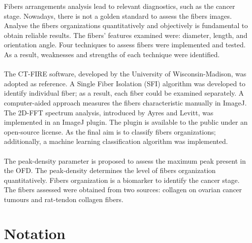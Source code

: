 \documentclass[12pt,a4paper]{article}
\begin{document}
Fibers arrangements analysis lead to relevant diagnostics, such as the cancer stage. Nowadays, there is not a golden standard to assess the fibers images. Analyse the fibers organizations quantitatively and objectively is fundamental to obtain reliable results. The fibers' features examined were: diameter, length, and orientation angle. Four techniques to assess fibers were implemented and tested. As a result, weaknesses and strengths of each technique were identified. 

\paragraph{}
The CT-FIRE software, developed by the University of Wisconsin-Madison, was adopted as reference. A Single Fiber Isolation (SFI) algorithm was developed to identify individual fiber; as a result, each fiber could be examined separately.  A computer-aided approach measures the fibers characteristic manually in ImageJ. The 2D-FFT spectrum analysis, introduced by Ayres and Levitt, was implemented in an ImageJ plugin. The plugin is available to the public under an open-source license. As the final aim is to classify fibers organizations; additionally, a machine learning classification algorithm was implemented.
 
\paragraph{}
The peak-density parameter is proposed to assess the maximum peak present in the OFD. The peak-density determines the level of fibers organization quantitatively. Fibers organization is a biomarker to identify the cancer stage. The fibers assessed were obtained from two sources: collagen on ovarian cancer tumours and rat-tendon collagen fibers.
\thispagestyle{empty}
\newpage

\newpage\null\thispagestyle{empty}\newpage

\thispagestyle{empty}
\tableofcontents
\thispagestyle{empty}
\thispagestyle{empty}
\newpage
\listoffigures

\listoftables
\thispagestyle{empty}
\newpage

\section*{Notation }
\end{document}
